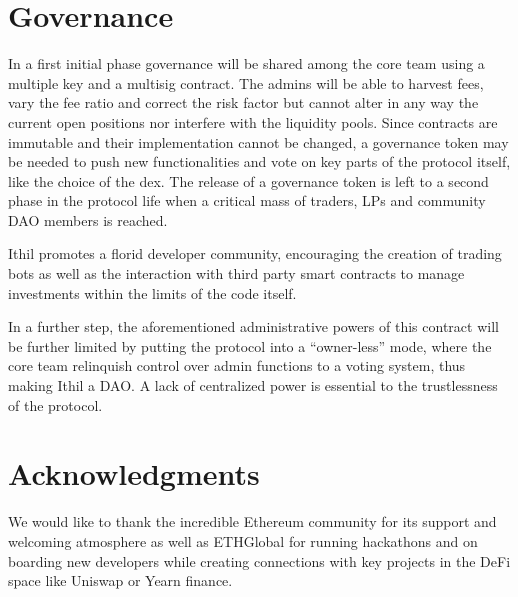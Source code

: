 \documentclass[a4paper,10 pt]{article}
\theoremstyle{definition}
\begin{document}
\section{Governance}
In a first initial phase governance will be shared among the core team using a multiple key and a multisig contract. The admins will be able to harvest fees, vary the fee ratio and correct the risk factor but cannot alter in any way the current open positions nor interfere with the liquidity pools.
Since contracts are immutable and their implementation cannot be changed, a governance token may be needed to push new functionalities and vote on key parts of the protocol itself, like the choice of the dex. The release of a governance token is left to a second phase in the protocol life when a critical mass of traders, LPs and community DAO members is reached.

Ithil promotes a florid developer community, encouraging the creation of trading bots as well as the interaction with third party smart contracts to manage investments within the limits of the code itself.

In a further step, the aforementioned administrative powers of this contract will be further limited by putting the protocol into a “owner-less” mode, where the core team relinquish control over admin functions to a voting system, thus making Ithil a DAO. A lack of centralized power is essential to the trustlessness of the protocol.

\section{Acknowledgments}

We would like to thank the incredible Ethereum community for its support and welcoming atmosphere as well as ETHGlobal for running hackathons and on boarding new developers while creating connections with key projects in the DeFi space like Uniswap or Yearn finance.
\end{document}
